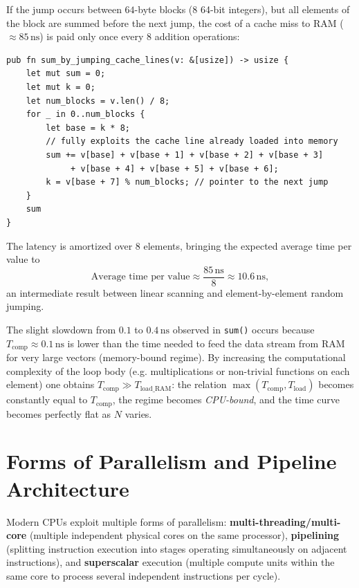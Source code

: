 \begin{example}
If the jump occurs between $64$-byte blocks ($8$ 64-bit integers), but all elements of the block are summed before the next jump, the cost of a cache miss to RAM ($\approx 85\,\text{ns}$) is paid only once every $8$ addition operations:
\begin{lstlisting}[style=rustcode]
pub fn sum_by_jumping_cache_lines(v: &[usize]) -> usize {
    let mut sum = 0;
    let mut k = 0;
    let num_blocks = v.len() / 8;
    for _ in 0..num_blocks {
        let base = k * 8;
        // fully exploits the cache line already loaded into memory
        sum += v[base] + v[base + 1] + v[base + 2] + v[base + 3]
             + v[base + 4] + v[base + 5] + v[base + 6];
        k = v[base + 7] % num_blocks; // pointer to the next jump
    }
    sum
}
\end{lstlisting}
The latency is amortized over $8$ elements, bringing the expected average time per value to
\[
\text{Average time per value} \approx \frac{85\,\text{ns}}{8} \approx 10.6\,\text{ns},
\]
an intermediate result between linear scanning and element-by-element random jumping.
\end{example}

\begin{remark}
The slight slowdown from $0.1$ to $0.4\,\text{ns}$ observed in \texttt{sum()} occurs because $T_{\text{comp}} \approx 0.1\,\text{ns}$ is lower than the time needed to feed the data stream from RAM for very large vectors (memory-bound regime). By increasing the computational complexity of the loop body (e.g. multiplications or non-trivial functions on each element) one obtains $T_{\text{comp}} \gg T_{\text{load\_RAM}}$: the relation $\max(T_{\text{comp}}, T_{\text{load}})$ becomes constantly equal to $T_{\text{comp}}$, the regime becomes \textit{CPU-bound}, and the time curve becomes perfectly flat as $N$ varies.
\end{remark}

\FloatBarrier
\section{Forms of Parallelism and Pipeline Architecture}

Modern CPUs exploit multiple forms of parallelism: \textbf{multi-threading/multi-core} (multiple independent physical cores on the same processor), \textbf{pipelining} (splitting instruction execution into stages operating simultaneously on adjacent instructions), and \textbf{superscalar} execution (multiple compute units within the same core to process several independent instructions per cycle).

